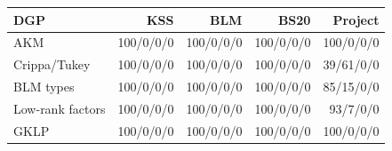 \begin{tabular}{lrrrr}
\toprule
DGP & KSS & BLM & BS20 & Project \\
\midrule
AKM & 100/0/0/0 & 100/0/0/0 & 100/0/0/0 & 100/0/0/0 \\
Crippa/Tukey & 100/0/0/0 & 100/0/0/0 & 100/0/0/0 & 39/61/0/0 \\
BLM types & 100/0/0/0 & 100/0/0/0 & 100/0/0/0 & 85/15/0/0 \\
Low-rank factors & 100/0/0/0 & 100/0/0/0 & 100/0/0/0 & 93/7/0/0 \\
GKLP & 100/0/0/0 & 100/0/0/0 & 100/0/0/0 & 100/0/0/0 \\
\bottomrule
\end{tabular}

